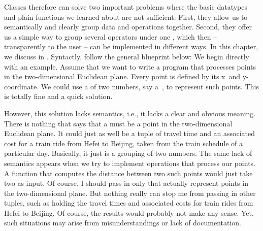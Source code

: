 Classes therefore can solve two important problems where the basic datatypes and plain functions we learned about are not sufficient:
First, they allow us to semantically and clearly group data and operations together.
Second, they offer us a simple way to group several operators under one , which then -- transparently to the user -- can be implemented in different ways.
In this chapter, we discuss  in \python.
Syntactly,  follow the general blueprint below:%
%
%
%
%
%
%
\label{sec:immutableClassPoints2D}%
%
%
%
%
%
%
%
We begin directly with an example.
Assume that we want to write a program that processes points in the two-dimensional Euclidean plane.
Every point is defined by its x\nobreakdashes~and y\nobreakdashes-coordinate.
We could use a  of two numbers, say a~, to represent such points.
This is totally fine and a quick solution.

However, this solution lacks semantics, i.e., it lacks a clear and obvious meaning.
There is nothing that says that a  must be a point in the two-dimensional Euclidean plane.
It could just as well be a tuple of travel time and an associated cost for a train ride from Hefei to Beijing, taken from the train schedule of a particular day.
Basically, it just is a grouping of two numbers.
The same lack of semantics appears when we try to implement operations that process our points.
A function that computes the distance between two such points would just take two  as input.
Of course, I should pass in only  that actually represent points in the two-dimensional plane.
But nothing really can stop me from passing in other tuples, such as  holding the travel times and associated costs for train rides from Hefei to Beijing.
Of course, the results would probably not make any sense.
Yet, such situations may arise from misunderstandings or lack of documentation.

